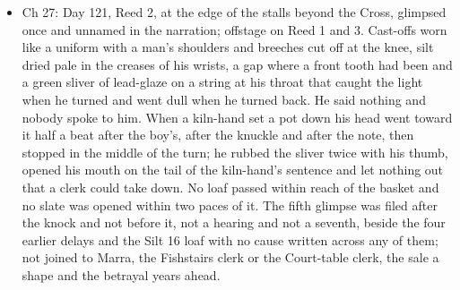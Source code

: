\documentclass{design/chronicle}
\begin{document}
{\begin{itemize}[leftmargin=1.4em,itemsep=1pt,topsep=3pt,parsep=0pt]
\end{itemize}

\begin{itemize}[leftmargin=1.4em,itemsep=1pt,topsep=3pt,parsep=0pt]

\item Ch 27: Day 121, Reed 2, at the edge of the stalls beyond the Cross, glimpsed once and unnamed in the narration; offstage on Reed 1 and 3. Cast-offs worn like a uniform with a man’s shoulders and breeches cut off at the knee, silt dried pale in the creases of his wrists, a gap where a front tooth had been and a green sliver of lead-glaze on a string at his throat that caught the light when he turned and went dull when he turned back. He said nothing and nobody spoke to him. When a kiln-hand set a pot down his head went toward it half a beat after the boy’s, after the knuckle and after the note, then stopped in the middle of the turn; he rubbed the sliver twice with his thumb, opened his mouth on the tail of the kiln-hand’s sentence and let nothing out that a clerk could take down. No loaf passed within reach of the basket and no slate was opened within two paces of it. The fifth glimpse was filed after the knock and not before it, not a hearing and not a seventh, beside the four earlier delays and the Silt 16 loaf with no cause written across any of them; not joined to Marra, the Fishstairs clerk or the Court-table clerk, the sale a shape and the betrayal years ahead.

\end{itemize}
}
\end{document}
